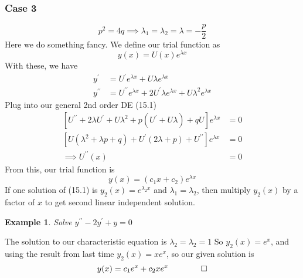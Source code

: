 \documentclass{report}
\newtheorem{ex}{Example}[section]
\begin{document}
\subsubsection{Case 3}
$$p^2 = 4q \implies \lambda_1 = \lambda_2 = \lambda = -\frac{p}{2}$$
Here we do something fancy. We define our trial function as
$$y(x) = U(x)e^{\lambda x}$$ With these, we have
\begin{align*}
y^\prime &= U^\prime e^{\lambda x} + U\lambda e^{\lambda x} \\
y^{\prime\prime} &= U^{\prime\prime}e^{\lambda x} + 2U^\prime \lambda e^{\lambda x} + U\lambda^2e^{\lambda x}
\end{align*}
Plug into our general 2nd order DE (15.1)
\begin{align}
\left[U^{\prime\prime} + 2\lambda U^\prime + U\lambda^2 + p(U^\prime + U\lambda) + qU\right]e^{\lambda x} &= 0 \\
\left[U(\lambda^2 + \lambda p + q) + U^\prime(2\lambda + p) + U^{\prime\prime}\right]e^{\lambda x} &= 0 \\
\implies U^{\prime\prime}(x) &= 0
\end{align}
From this, our trial function is
$$y(x) = (c_1x + c_2)e^{\lambda x}$$
If one solution of (15.1) is $y_2(x) = e^{\lambda_2 x}$ and $\lambda_1 = \lambda_2$, then multiply $y_2(x)$ by a factor of $x$ to get second linear independent solution.
\begin{ex}
Solve $y^{\prime\prime} -2y^\prime + y = 0$
\end{ex}\noindent
The solution to our characteristic equation is $\lambda_2 = \lambda_2 = 1$
So $y_2(x) = e^x$, and using the result from last time $y_2(x) = xe^x$, so our given solution is
$$y(x) = c_1e^x + c_2xe^x \qquad \qed$$
\end{document}
